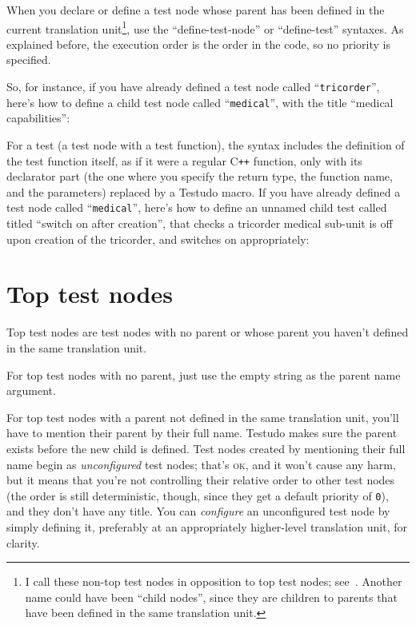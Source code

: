 \documentclass[twoside, a4paper, article]{memoir}
\newcommand\typesetexampleandreport[1]{%
  \typesetexamplesource{#1}
  \typesetexamplereport{#1}
}
\providecommand\typesetexamplereport[1]{%
}
\providecommand\typesetexamplesource[1]{%
}
\newcommand*\Cpp{C\texttt{++}}
\begin{document}
When you declare or define a test node whose parent has been defined in the
current translation unit\footnote{I call these non-top test nodes in opposition
  to top test nodes; see~.  Another name could have
  been ``child nodes'', since they are children to parents that have been
  defined in the same translation unit.}, use the ``define-test-node'' or
``define-test'' syntaxes.  As explained before, the execution order is the
order in the code, so no priority is specified.

So, for instance, if you have already defined a test node called
``\texttt{tricorder}'', here's how to define a child test node called
``\texttt{medical}'', with the title ``medical capabilities'':

\typesetexampleandreport{define-test-node}

For a test (a test node with a test function), the syntax includes the
definition of the test function itself, as if it were a regular \Cpp{}
function, only with its declarator part (the one where you specify the return
type, the function name, and the parameters) replaced by a Testudo macro.  If
you have already defined a test node called ``\texttt{medical}'', here's how to
define an unnamed child test called titled ``switch on after creation'', that
checks a tricorder medical sub-unit is off upon creation of the tricorder, and
switches on appropriately:

\typesetexampleandreport{define-test-full}

\section{Top test nodes}
\label{sec:top-test-nodes}

Top test nodes are test nodes with no parent or whose parent you haven't
defined in the same translation unit.

For top test nodes with no parent, just use the empty string as the parent name argument.

For top test nodes with a parent not defined in the same translation unit,
you'll have to mention their parent by their full name.  Testudo makes sure the
parent exists before the new child is defined.  Test nodes created by
mentioning their full name begin as \emph{unconfigured} test nodes; that's
\textsc{ok}, and it won't cause any harm, but it means that you're not
controlling their relative order to other test nodes (the order is still
deterministic, though, since they get a default priority of \texttt{0}), and
they don't have any title.  You can \emph{configure} an unconfigured test node
by simply defining it, preferably at an appropriately higher-level translation
unit, for clarity.
\end{document}
